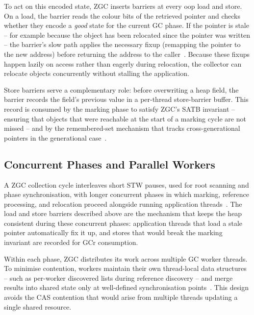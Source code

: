 To act on this encoded state, \ac{ZGC} inserts barriers at every oop load and store. On a load, the barrier reads the colour bits of the retrieved pointer and checks whether they encode a \emph{good} state for the current \ac{GC} phase. If the pointer is stale -- for example because the object has been relocated since the pointer was written -- the barrier's slow path applies the necessary fixup (remapping the pointer to the new address) before returning the address to the caller~\cite{jep333-zgc,openjdk-zbarrier-cpp}. Because these fixups happen lazily on access rather than eagerly during relocation, the collector can relocate objects concurrently without stalling the application.

Store barriers serve a complementary role: before overwriting a heap field, the barrier records the field's previous value in a per-thread store-barrier buffer. This record is consumed by the marking phase to satisfy \ac{ZGC}'s \ac{SATB} invariant -- ensuring that objects that were reachable at the start of a marking cycle are not missed -- and by the remembered-set mechanism that tracks cross-generational pointers in the generational case~\cite{openjdk-zbarrier-cpp}.

\subsection{Concurrent Phases and Parallel Workers}
\label{subsec:bg-zgc-phases}

A \ac{ZGC} collection cycle interleaves short \ac{STW} pauses, used for root scanning and phase synchronisation, with longer concurrent phases in which marking, reference processing, and relocation proceed alongside running application threads~\cite{jep333-zgc,openjdk-zreferenceprocessor-cpp}. The load and store barriers described above are the mechanism that keeps the heap consistent during these concurrent phases: application threads that load a stale pointer automatically fix it up, and stores that would break the marking invariant are recorded for \ac{GCr} consumption.

Within each phase, \ac{ZGC} distributes its work across multiple \ac{GC} worker threads. To minimise contention, workers maintain their own thread-local data structures -- such as per-worker discovered lists during reference discovery -- and merge results into shared state only at well-defined synchronisation points~\cite{openjdk-zworkers-cpp,openjdk-zreferenceprocessor-cpp}. This design avoids the \ac{CAS} contention that would arise from multiple threads updating a single shared resource.

